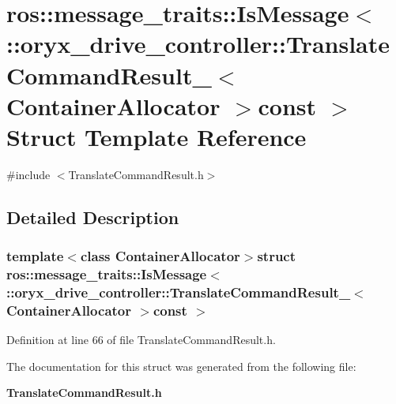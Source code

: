 \section{ros\-:\-:message\-\_\-traits\-:\-:\-Is\-Message$<$ \-:\-:oryx\-\_\-drive\-\_\-controller\-:\-:\-Translate\-Command\-Result\-\_\-$<$ \-Container\-Allocator $>$const $>$ \-Struct \-Template \-Reference}
\label{structros_1_1message__traits_1_1IsMessage_3_01_1_1oryx__drive__controller_1_1TranslateCommandRes3b05cd35e9328f2960f58fec90601888}


{\ttfamily \#include $<$\-Translate\-Command\-Result.\-h$>$}



\subsection{\-Detailed \-Description}
\subsubsection*{template$<$class Container\-Allocator$>$struct ros\-::message\-\_\-traits\-::\-Is\-Message$<$ \-::oryx\-\_\-drive\-\_\-controller\-::\-Translate\-Command\-Result\-\_\-$<$ Container\-Allocator $>$const  $>$}



\-Definition at line 66 of file \-Translate\-Command\-Result.\-h.



\-The documentation for this struct was generated from the following file\-:\begin{DoxyCompactItemize}
\item 
{\bf \-Translate\-Command\-Result.\-h}\end{DoxyCompactItemize}
